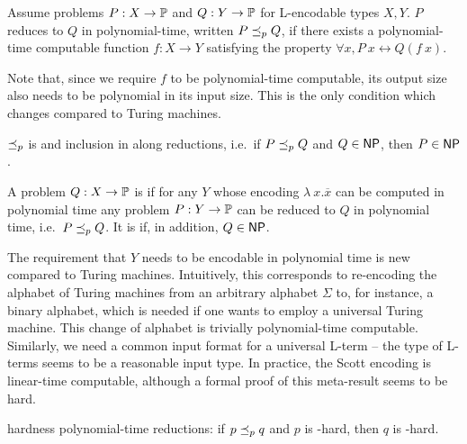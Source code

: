 \begin{definition}
  Assume problems $P : X \rightarrow \mathbb{P}$ and $Q : Y \rightarrow \mathbb{P}$ for L-encodable types $X, Y$. $P$ reduces to $Q$ in polynomial-time, written $P \preceq_p{} Q$, if there exists a polynomial-time computable function $f : X \rightarrow Y$ satisfying the property $\forall x, P~x \leftrightarrow Q(f~x)$. 
\end{definition}
Note that, since we require $f$ to be polynomial-time computable, its output size also needs to be polynomial in its input size. This is the only condition which changes compared to Turing machines.

$\preceq_p$ is  and inclusion in \NP{}  along reductions, i.e.\ if $P \preceq_p{} Q$ and $Q \in \normalfont\textsf{NP}{}$, then $P \in \textsf{NP}{}$.

\begin{definition}
  A problem $Q : X \rightarrow \mathbb{P}$ is  if for any $Y$ whose encoding $\lambda~x. \overline{x}$ can be computed in polynomial time any problem $P : Y \rightarrow \mathbb{P}$ can be reduced to $Q$ in polynomial time, i.e.\ $P \preceq_p{} Q$. It is  if, in addition, $Q \in \normalfont\textsf{NP}{}$.
\end{definition}

The requirement that $Y$ needs to be encodable in polynomial time is new compared to Turing machines. Intuitively, this corresponds to re-encoding the alphabet of Turing machines from an arbitrary alphabet $\Sigma$ to, for instance, a binary alphabet, which is needed if one wants to employ a universal Turing machine. This change of alphabet is trivially polynomial-time computable.
Similarly, we need a common input format for a universal L-term -- the type of L-terms seems to be a reasonable input type. In practice, the Scott encoding is linear-time computable, although a formal proof of this meta-result seems to be hard.

\NP{} hardness  polynomial-time reductions: if $p \preceq_p{} q$ and $p$ is \NP{}-hard, then $q$ is \NP{}-hard.

